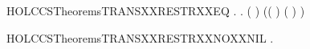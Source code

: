 \newcommand{\HOLCCSTheoremsTRANSXXRESTR}{\UseVerbatim{HOLCCSTheoremsTRANSXXRESTR}}
\begin{SaveVerbatim}{HOLCCSTheoremsTRANSXXRESTRXXEQ}
\HOLTokenTurnstile{} \HOLSymConst{\HOLTokenForall{}}   .
       \HOLConst{\ensuremath{\nu}}   \HOLTokenTransBegin{}\HOLTokenTransEnd {} \HOLSymConst{\HOLTokenEquiv{}}
       \HOLSymConst{\HOLTokenExists{}} .
           ( \HOLSymConst{=} \HOLConst{\ensuremath{\nu}}  ) \HOLSymConst{\HOLTokenConj{}}  \HOLTokenTransBegin{}\HOLTokenTransEnd {} \HOLSymConst{\HOLTokenConj{}}
           (( \HOLSymConst{=} \HOLConst{\ensuremath{\tau}}) \HOLSymConst{\HOLTokenDisj{}} ( \HOLSymConst{=}  ) \HOLSymConst{\HOLTokenConj{}}  \HOLConst{\HOLTokenNotIn{}}  \HOLSymConst{\HOLTokenConj{}}   \HOLConst{\HOLTokenNotIn{}} )
\end{SaveVerbatim}
\newcommand{\HOLCCSTheoremsTRANSXXRESTRXXEQ}{\UseVerbatim{HOLCCSTheoremsTRANSXXRESTRXXEQ}}
\begin{SaveVerbatim}{HOLCCSTheoremsTRANSXXRESTRXXNOXXNIL}
\HOLTokenTurnstile{} \HOLSymConst{\HOLTokenForall{}}   . \HOLConst{\ensuremath{\nu}}   \HOLTokenTransBegin{}\HOLTokenTransEnd \HOLConst{\ensuremath{\nu}}   \HOLSymConst{\HOLTokenImp{}}  \HOLSymConst{\HOLTokenNotEqual{}} 
\end{SaveVerbatim}
\newcommand{\HOLCCSTheoremsTRANSXXRESTRXXNOXXNIL}{\UseVerbatim{HOLCCSTheoremsTRANSXXRESTRXXNOXXNIL}}
